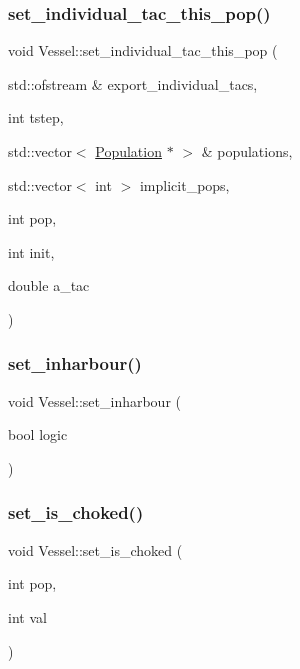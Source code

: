 \subsubsection{\texorpdfstring{set\_individual\_tac\_this\_pop()}{set\_individual\_tac\_this\_pop()}}
{\footnotesize\ttfamily void Vessel\+::set\+\_\+individual\+\_\+tac\+\_\+this\+\_\+pop (\begin{DoxyParamCaption}\item[{std\+::ofstream \&}]{export\+\_\+individual\+\_\+tacs,  }\item[{int}]{tstep,  }\item[{std\+::vector$<$ \mbox{\hyperlink{class_population}{Population}} $\ast$ $>$ \&}]{populations,  }\item[{std\+::vector$<$ int $>$}]{implicit\+\_\+pops,  }\item[{int}]{pop,  }\item[{int}]{init,  }\item[{double}]{a\+\_\+tac }\end{DoxyParamCaption})}

\mbox{\label{class_vessel_a29fa850ee9a2e0ea92c2dc6c8c2b90c0}} 
\subsubsection{\texorpdfstring{set\_inharbour()}{set\_inharbour()}}
{\footnotesize\ttfamily void Vessel\+::set\+\_\+inharbour (\begin{DoxyParamCaption}\item[{bool}]{logic }\end{DoxyParamCaption})}

\mbox{\label{class_vessel_ad734b1b30a7306d192a0a2a5b1d474d7}} 
\subsubsection{\texorpdfstring{set\_is\_choked()}{set\_is\_choked()}}
{\footnotesize\ttfamily void Vessel\+::set\+\_\+is\+\_\+choked (\begin{DoxyParamCaption}\item[{int}]{pop,  }\item[{int}]{val }\end{DoxyParamCaption})}

